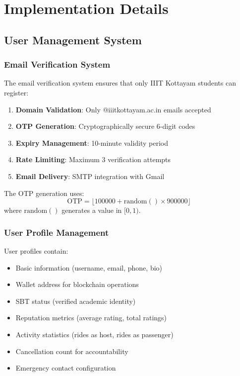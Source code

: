 \chapter{Implementation Details}

\section{User Management System}

\subsection{Email Verification System}

The email verification system ensures that only IIIT Kottayam students can register:

\begin{enumerate}
    \item \textbf{Domain Validation}: Only @iiitkottayam.ac.in emails accepted
    \item \textbf{OTP Generation}: Cryptographically secure 6-digit codes
    \item \textbf{Expiry Management}: 10-minute validity period
    \item \textbf{Rate Limiting}: Maximum 3 verification attempts
    \item \textbf{Email Delivery}: SMTP integration with Gmail
\end{enumerate}

The OTP generation uses:
\begin{equation}
\text{OTP} = \lfloor 100000 + \text{random}() \times 900000 \rfloor
\end{equation}
where $\text{random}()$ generates a value in $[0, 1)$.

\subsection{User Profile Management}

User profiles contain:

\begin{itemize}
    \item Basic information (username, email, phone, bio)
    \item Wallet address for blockchain operations
    \item SBT status (verified academic identity)
    \item Reputation metrics (average rating, total ratings)
    \item Activity statistics (rides as host, rides as passenger)
    \item Cancellation count for accountability
    \item Emergency contact configuration
\end{itemize}

